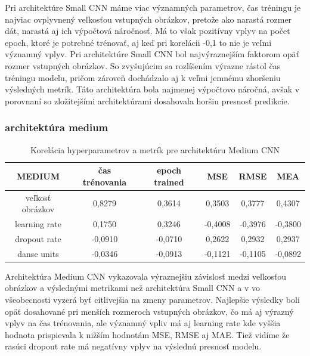 Pri architektúre Small CNN  máme viac významných parametrov, čas tréningu je najviac ovplyvnený veľkosťou vstupných obrázkov, pretože ako narastá rozmer dát, narastá aj ich výpočtová náročnosť. Má to však pozitívny vplyv na počet epoch, ktoré je potrebné trénovať, aj keď pri korelácii -0,1 to nie je veľmi významný vplyv. 
Pri architektúre Small CNN bol najvýraznejším faktorom opäť rozmer vstupných obrázkov.  So zvyšujúcim sa rozlíšením výrazne rástol čas tréningu modelu, pričom zároveň dochádzalo aj k veľmi jemnému zhoršeniu výsledných metrík. Táto architektúra bola najmenej výpočtovo náročná, avšak v porovnaní so zložitejšími architektúrami dosahovala horšiu presnosť predikcie. 

\subsubsection{architektúra medium}
\begin{table}[h]
\caption{Korelácia hyperparametrov a metrík pre architektúru Medium CNN}
\label{tab:medium_corr}
\begin{tabular}{ | c |  c  c c c  c |}
\hline
	MEDIUM		& čas trénovania &  epoch trained & MSE 		&  RMSE  & MEA  \\
\hline
veľkosť obrázkov 	& 0,8279 		& 0,3614 		& 0,3503 	& 0,3777 & 0,4307 \\
learning rate 		& 0,1750 		& 0,3246 		& -0,4008 	& -0,3976 & -0,3800 \\
dropout rate 		& -0,0910 		& -0,0710 		& 0,2622 	& 0,2932 & 0,2937 \\
danse units 			& -0,0346 		& -0,0913		& -0,1121 	& -0,1105  & -0,0892 \\
\hline
\end{tabular}
\end{table}

Architektúra Medium CNN vykazovala výraznejšiu závislosť medzi veľkosťou obrázkov a výslednými metrikami než architektúra Small CNN a v vo všeobecnosti vyzerá byť citlivejšia na zmeny parametrov. Najlepšie výsledky boli opäť dosahované pri menších rozmeroch vstupných obrázkov, čo má aj výrazný vplyv na čas trénovania, ale významný vpliv má aj learning rate kde vyššia hodnota prispievala k nižším hodnotám MSE, RMSE aj MAE. Tiež vidíme že rasúci dropout rate má negatívny vplyv na výslednú presnosť modelu.



